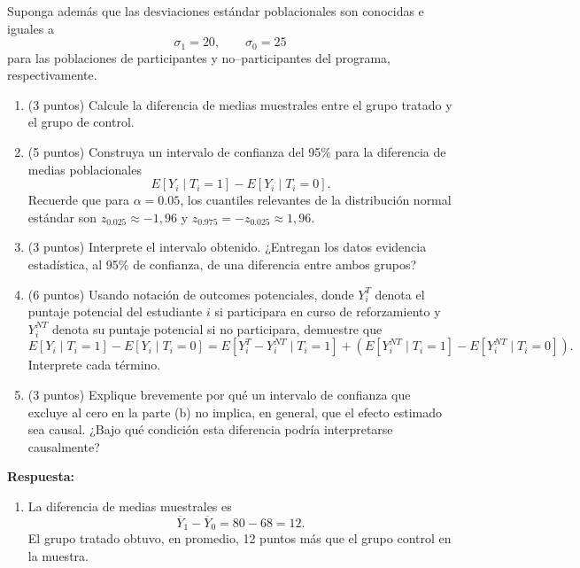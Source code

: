 \documentclass[10pt,a4paper]{article}
\begin{document}
\begin{enumerate}
    Suponga además que las desviaciones estándar poblacionales son conocidas e iguales a
    $$
        \sigma_1=20,
        \qquad
        \sigma_0=25
    $$
    para las poblaciones de participantes y no--participantes del programa, respectivamente.
    
    \begin{enumerate}
        \item (3 puntos) Calcule la diferencia de medias muestrales entre el grupo tratado y el grupo de control.
    
        \item (5 puntos) Construya un intervalo de confianza del 95\% para la diferencia de medias poblacionales
        $$
            E[Y_i\mid T_i=1]
            -
            E[Y_i\mid T_i=0]
            \text{.}
        $$
        Recuerde que para $\alpha = 0.05$, los cuantiles relevantes de la distribución normal estándar son $z_{0.025} \approx -1,96$ y $z_{0.975} = - z_{0.025} \approx 1,96$.
    
        \item (3 puntos) Interprete el intervalo obtenido. ¿Entregan los datos evidencia estadística, al 95\% de confianza, de una diferencia entre ambos grupos?
    
        \item (6 puntos) Usando notación de outcomes potenciales, donde $Y_i^{T}$ denota el puntaje potencial del estudiante $i$ si participara en curso de reforzamiento y $Y_i^{NT}$ denota su puntaje potencial si no participara, demuestre que
        $$
            E[Y_i\mid T_i=1]
            -
            E[Y_i\mid T_i=0]
            =
            E[Y_i^T-Y_i^{NT}\mid T_i=1]
            +
            \left(
            E[Y_i^{NT}\mid T_i=1]-E[Y_i^{NT}\mid T_i=0]
            \right)
        \text{.}
        $$
        Interprete cada término.
    
        \item (3 puntos) Explique brevemente por qué un intervalo de confianza que excluye al cero en la parte (b) no implica, en general, que el efecto estimado sea causal. ¿Bajo qué condición esta diferencia podría interpretarse causalmente?
    \end{enumerate}

    {
        \color{blue}
        \textbf{Respuesta:}

        \begin{enumerate}

            \item La diferencia de medias muestrales es
                $$
                    \overline Y_1
                    -
                    \overline Y_0
                    =
                    80
                    -
                    68
                    =
                    12
                    \text{.}
                $$
                El grupo tratado obtuvo, en promedio, 12 puntos más que el grupo control en la muestra.


\end{enumerate}}
\end{enumerate}
\end{document}
